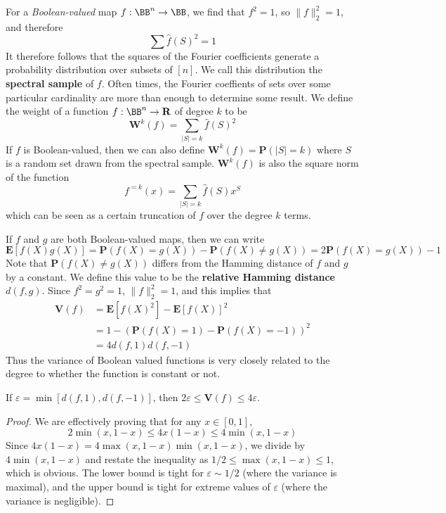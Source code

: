 For a {\it Boolean-valued} map $f: \BB^n \to \BB$, we find that $f^2 = 1$, so $\| f \|_2^2 = 1$, and therefore
%
\[ \sum \widehat{f}(S)^2 = 1 \]
%
It therefore follows that the squares of the Fourier coefficients generate a probability distribution over subsets of $[n]$. We call this distribution the {\bf spectral sample} of $f$. Often times, the Fourier coeffients of sets over some particular cardinality are more than enough to determine some result. We define the weight of a function $f: \BB^n \to \mathbf{R}$ of degree $k$ to be
%
\[ \mathbf{W}^k(f) = \sum_{|S| = k} \widehat{f}(S)^2 \]
%
If $f$ is Boolean-valued, then we can also define $\mathbf{W}^k(f) = \mathbf{P}(|S| = k)$ where $S$ is a random set drawn from the spectral sample. $\mathbf{W}^k(f)$ is also the square norm of the function
%
\[ f^{=k}(x) = \sum_{|S| = k} \widehat{f}(S) x^S \]
%
which can be seen as a certain truncation of $f$ over the degree $k$ terms.

If $f$ and $g$ are both Boolean-valued maps, then we can write
%
\[ \mathbf{E}[f(X)g(X)] = \mathbf{P}(f(X) = g(X)) - \mathbf{P}(f(X) \neq g(X)) = 2\mathbf{P}(f(X) = g(X)) - 1 \]
%
Note that $\mathbf{P}(f(X) \neq g(X))$ differs from the Hamming distance of $f$ and $g$ by a constant. We define this value to be the {\bf relative Hamming distance} $d(f,g)$. Since $f^2 = g^2 = 1$, $\| f \|_2^2 = 1$, and this implies that
%
\begin{align*}
    \mathbf{V}(f) &= \mathbf{E}[f(X)^2] - \mathbf{E}[f(X)]^2\\
    &= 1 - (\mathbf{P}(f(X) = 1) - \mathbf{P}(f(X) = -1))^2\\
    &= 4d(f,1)d(f,-1)
\end{align*}
%
Thus the variance of Boolean valued functions is very closely related to the degree to whether the function is constant or not.

\begin{lemma}
    If $\varepsilon = \min[d(f,1),d(f,-1)]$, then $2\varepsilon \leq \mathbf{V}(f) \leq 4\varepsilon$.
\end{lemma}
\begin{proof}
    We are effectively proving that for any $x \in [0,1]$,
    \[ 2\min(x,1-x) \leq 4x(1-x) \leq 4\min(x,1-x) \]
    Since $4x(1-x) = 4\max(x,1-x)\min(x,1-x)$, we divide by $4\min(x,1-x)$ and restate the inequality as $1/2 \leq \max(x,1-x) \leq 1$, which is obvious. The lower bound is tight for $\varepsilon \sim 1/2$ (where the variance is maximal), and the upper bound is tight for extreme values of $\varepsilon$ (where the variance is negligible).
\end{proof}

